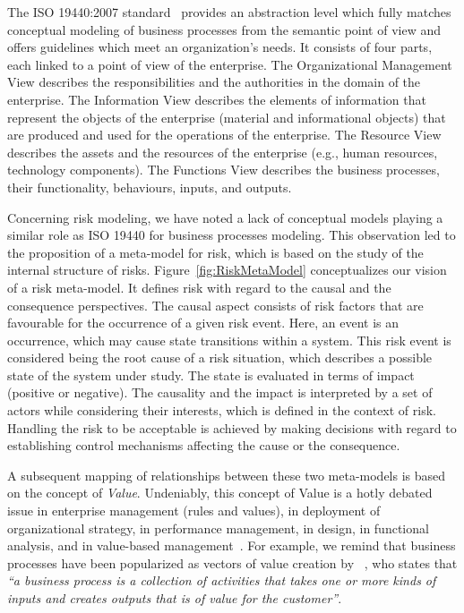 \documentclass[preprint,3p,times,number]{elsarticle}
\begin{document}
The ISO 19440:2007 standard~\cite{iso_iso_2007} provides an abstraction level which fully matches conceptual modeling of business processes from the semantic point of view and offers guidelines which meet an organization’s needs. It consists of four parts, each linked to a point of view of the enterprise. The Organizational Management View describes the responsibilities and the authorities in the domain of the enterprise. The Information View describes the elements of information that represent the objects of the enterprise (material and informational objects) that are produced and used for the operations of the enterprise. The Resource View describes the assets and the resources of the enterprise (e.g., human resources, technology components). The Functions View describes the business processes, their functionality, behaviours, inputs, and outputs.



Concerning risk modeling, we have noted a lack of conceptual models playing a similar role as ISO 19440 for business processes modeling. This observation led to the proposition of a meta-model for risk, which is based on the study of the internal structure of risks. Figure~\ref{fig:RiskMetaModel} conceptualizes our vision of a risk meta-model. It defines risk with regard to the causal and the consequence perspectives. The causal aspect consists of risk factors that are favourable for the occurrence of a given risk event. Here, an event is an occurrence, which may cause state transitions within a system. This risk event is considered being the root cause of a risk situation, which describes a possible state of the system under study. The state is evaluated in terms of impact (positive or negative). The causality and the impact is interpreted by a set of actors while considering their interests, which is defined in the context of risk. Handling the risk to be acceptable is achieved by making decisions with regard to establishing control mechanisms affecting the cause or the consequence.

A subsequent mapping of relationships between these two meta-models is based on the concept of \emph{Value}. Undeniably, this concept of Value is a hotly debated issue in enterprise management (rules and values), in deployment of organizational strategy, in performance management, in design, in functional analysis, and in value-based management~\cite{philippe2003, bosch2007}. For example, we remind that business processes have been popularized as vectors of value creation by ~\cite[p.\ 38]{hammer1993}, who states that \emph{“a business process is a collection of activities that takes one or more kinds of inputs and creates outputs that is of value for the customer”}.
\end{document}
